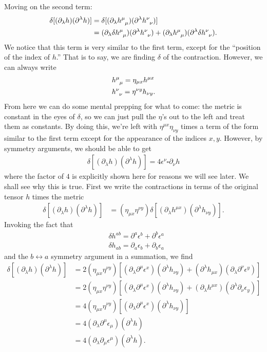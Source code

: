 \documentclass{book}
\theoremstyle{definition}
\newcommand{\p}{\partial}
\newcommand{\nn}{\nonumber}
\newcommand{\lp}{\left(}
\newcommand{\rp}{\right)}
\begin{document}
Moving on the second term:
\begin{align}
\delta[(\p_\lambda h)( \p^\lambda h)] &= \delta[(\p_\lambda \tensor{h}{^\mu_\mu})( \p^\lambda \tensor{h}{^\nu_\nu})]\nn\\
&= (\p_\lambda \delta\tensor{h}{^\mu_\mu})( \p^\lambda \tensor{h}{^\nu_\nu}) + (\p_\lambda \tensor{h}{^\mu_\mu})( \p^\lambda \delta\tensor{h}{^\nu_\nu}).
\end{align}
We notice that this term is very similar to the first term, except for the ``position of the index of $h$.'' That is to say, we are finding $\delta$ of the contraction. However, we can always write
\begin{align}
&\tensor{h}{^\mu_\mu} = \eta_{\mu x}h^{\mu x}\\
&\tensor{h}{^\nu_\nu} = \eta^{\nu y}h_{\nu y}.
\end{align}
From here we can do some mental prepping for what to come: the metric is constant in the eyes of $\delta$, so we can just pull the $\eta$'s out to the left and treat them as constants. By doing this, we're left with $\eta^{\mu x}\eta_{\nu y}$ times a term of the form similar to the first term except for the appearance of the indices $x,y$. However, by symmetry arguments, we should be able to get
\begin{align}
\delta[(\p_\lambda h)( \p^\lambda h)] = 4\epsilon^\nu \square \p_\nu h
\end{align}
where the factor of $4$ is explicitly shown here for reasons we will see later. We shall see why this is true. First we write the contractions in terms of the original tensor $h$ times the metric 
\begin{align}
\delta[(\p_\lambda h)( \p^\lambda h)] &= \lp\eta_{\mu x}\eta^{\nu y}\rp\delta[(\p_\lambda h^{\mu x})(\p^\lambda h_{\nu y})].
\end{align}
Invoking the fact that
\begin{align}
&\delta h^{ab} = \p^a \epsilon^b + \p^b \epsilon^a \nn\\
&\delta h_{ab} = \p_a \epsilon_b + \p_b \epsilon_a 
\end{align}
and the $b\leftrightarrow a$ symmetry argument in a summation, we find
\begin{align}
\delta[(\p_\lambda h)( \p^\lambda h)] &= 2\lp\eta_{\mu x}\eta^{\nu y}\rp [(\p_\lambda \p^\mu \epsilon^x)(\p^\lambda h_{\nu y}) + (\p^\lambda h_{\mu x})(\p_\lambda \p^\nu \epsilon^y)]\nn\\
&= 2\lp\eta_{\mu x}\eta^{\nu y}\rp [(\p_\lambda \p^\mu \epsilon^x)(\p^\lambda h_{\nu y}) + (\p_\lambda h^{\mu x})(\p^\lambda \p_\nu \epsilon_y)]\nn\\
&= 4\lp\eta_{\mu x}\eta^{\nu y}\rp[(\p_\lambda \p^\mu \epsilon^x)(\p^\lambda h_{\nu y})]\nn\\
&= 4(\p_\lambda \p^\mu \epsilon_\mu)(\p^\lambda h)\nn\\
&= 4(\p_\lambda \p_\mu \epsilon^\mu)(\p^\lambda h).
\end{align}
\end{document}
